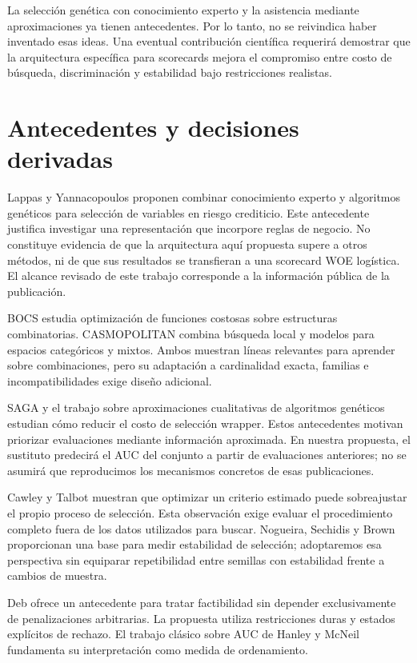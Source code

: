 \documentclass[11pt,letterpaper]{article}
\begin{document}
La selección genética con conocimiento experto y la asistencia mediante aproximaciones ya tienen antecedentes. Por lo tanto, no se reivindica haber inventado esas ideas. Una eventual contribución científica requerirá demostrar que la arquitectura específica para scorecards mejora el compromiso entre costo de búsqueda, discriminación y estabilidad bajo restricciones realistas.

\section{Antecedentes y decisiones derivadas}\label{sec:2}

Lappas y Yannacopoulos \cite{ref1} proponen combinar conocimiento experto y algoritmos genéticos para selección de variables en riesgo crediticio. Este antecedente justifica investigar una representación que incorpore reglas de negocio. No constituye evidencia de que la arquitectura aquí propuesta supere a otros métodos, ni de que sus resultados se transfieran a una scorecard WOE logística. El alcance revisado de este trabajo corresponde a la información pública de la publicación.

BOCS \cite{ref2} estudia optimización de funciones costosas sobre estructuras combinatorias. CASMOPOLITAN \cite{ref3} combina búsqueda local y modelos para espacios categóricos y mixtos. Ambos muestran líneas relevantes para aprender sobre combinaciones, pero su adaptación a cardinalidad exacta, familias e incompatibilidades exige diseño adicional.

SAGA \cite{ref4} y el trabajo sobre aproximaciones cualitativas de algoritmos genéticos \cite{ref5} estudian cómo reducir el costo de selección wrapper. Estos antecedentes motivan priorizar evaluaciones mediante información aproximada. En nuestra propuesta, el sustituto predecirá el AUC del conjunto a partir de evaluaciones anteriores; no se asumirá que reproducimos los mecanismos concretos de esas publicaciones.

Cawley y Talbot \cite{ref6} muestran que optimizar un criterio estimado puede sobreajustar el propio proceso de selección. Esta observación exige evaluar el procedimiento completo fuera de los datos utilizados para buscar. Nogueira, Sechidis y Brown \cite{ref7} proporcionan una base para medir estabilidad de selección; adoptaremos esa perspectiva sin equiparar repetibilidad entre semillas con estabilidad frente a cambios de muestra.

Deb \cite{ref8} ofrece un antecedente para tratar factibilidad sin depender exclusivamente de penalizaciones arbitrarias. La propuesta utiliza restricciones duras y estados explícitos de rechazo. El trabajo clásico sobre AUC de Hanley y McNeil \cite{ref9} fundamenta su interpretación como medida de ordenamiento.
\end{document}
